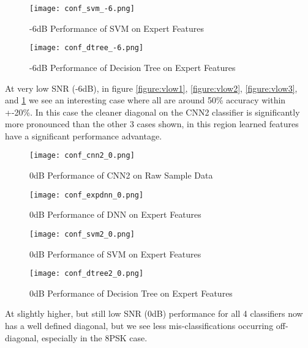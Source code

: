 \documentclass[runningheads,a4paper]{llncs}
\begin{document}
\begin{figure}[ht]
\centering
\begin{minipage}[b]{0.45\linewidth}
      \texttt{[image: conf\_svm\_-6.png]}
  \caption{-6dB Performance of SVM on Expert Features}\label{figure:vlow3}
\end{minipage}
\quad
\begin{minipage}[b]{0.45\linewidth}
      \texttt{[image: conf\_dtree\_-6.png]}
  \caption{-6dB Performance of Decision Tree on Expert Features}\label{figure:vlow4}
\end{minipage}
\end{figure}

At very low SNR (-6dB), in figure \ref{figure:vlow1}, \ref{figure:vlow2}, \ref{figure:vlow3}, and \ref{figure:vlow4} we see an interesting case where all are around 50\% accuracy within +-20\%.  In this case the cleaner diagonal on the CNN2 classifier is significantly more pronounced than the other 3 cases shown, in this region learned features have a significant performance advantage.


\begin{figure}[ht]
\centering
\begin{minipage}[b]{0.45\linewidth}
      \texttt{[image: conf\_cnn2\_0.png]}
  \caption{0dB Performance of CNN2 on Raw Sample Data}\label{figure:low1}
\end{minipage}
\quad
\begin{minipage}[b]{0.45\linewidth}
      \texttt{[image: conf\_expdnn\_0.png]}
  \caption{0dB Performance of DNN on Expert Features}\label{figure:low2}
\end{minipage}
\end{figure}

\begin{figure}[ht]
\centering
\begin{minipage}[b]{0.45\linewidth}
      \texttt{[image: conf\_svm2\_0.png]}
  \caption{0dB Performance of SVM on Expert Features}\label{figure:low3}
\end{minipage}
\quad
\begin{minipage}[b]{0.45\linewidth}
      \texttt{[image: conf\_dtree2\_0.png]}
  \caption{0dB Performance of Decision Tree on Expert Features}\label{figure:low4}
\end{minipage}
\end{figure}

At slightly higher, but still low SNR (0dB) performance for all 4 classifiers now has a well defined diagonal, but we see less mis-classifications occurring off-diagonal, especially in the 8PSK case.
\end{document}

